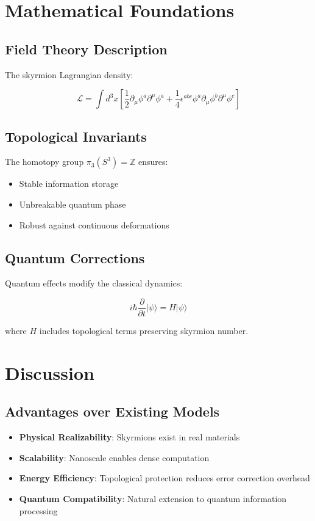 \documentclass[12pt,a4paper]{article}
\begin{document}
\section{Mathematical Foundations}

\subsection{Field Theory Description}

The skyrmion Lagrangian density:

\[
\mathcal{L} = \int d^3x \left[ \frac{1}{2} \partial_\mu \phi^a \partial^\mu \phi^a + \frac{1}{4} \epsilon^{abc} \phi^a \partial_\mu \phi^b \partial^\mu \phi^c \right]
\]

\subsection{Topological Invariants}

The homotopy group $\pi_3(S^3) = \mathbb{Z}$ ensures:
\begin{itemize}
    \item Stable information storage
    \item Unbreakable quantum phase
    \item Robust against continuous deformations
\end{itemize}

\subsection{Quantum Corrections}

Quantum effects modify the classical dynamics:

\[
i\hbar \frac{\partial}{\partial t} |\psi\rangle = H |\psi\rangle
\]

where $H$ includes topological terms preserving skyrmion number.

\section{Discussion}

\subsection{Advantages over Existing Models}

\begin{itemize}
    \item \textbf{Physical Realizability}: Skyrmions exist in real materials
    \item \textbf{Scalability}: Nanoscale enables dense computation
    \item \textbf{Energy Efficiency}: Topological protection reduces error correction overhead
    \item \textbf{Quantum Compatibility}: Natural extension to quantum information processing
\end{itemize}
\end{document}
